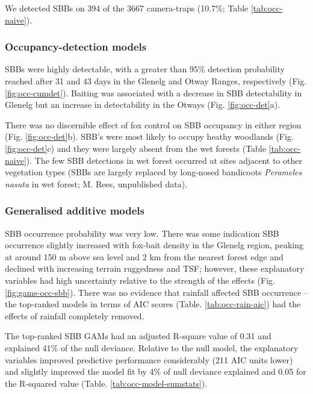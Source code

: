 \documentclass[11pt,a4paper,titlepage,twoside,openright]{style/unimelbthesis}
\begin{document}
\begin{mainmatter}
We detected SBBs on 394 of the 3667 camera-traps (10.7\%; Table \ref{tab:occ-naive}).

\hypertarget{occupancy-detection-models-3}{%
\subsubsection{Occupancy-detection models}\label{occupancy-detection-models-3}}

SBBs were highly detectable, with a greater than 95\% detection probability reached after 31 and 43 days in the Glenelg and Otway Ranges, respectively (Fig. \ref{fig:occ-cumdet}). Baiting was associated with a decrease in SBB detectability in Glenelg but an increase in detectability in the Otways (Fig. \ref{fig:occ-det}a).

There was no discernible effect of fox control on SBB occupancy in either region (Fig. \ref{fig:occ-det}b). SBB's were most likely to occupy heathy woodlands (Fig. \ref{fig:occ-det}c) and they were largely absent from the wet forests (Table \ref{tab:occ-naive}). The few SBB detections in wet forest occurred at sites adjacent to other vegetation types (SBBs are largely replaced by long-nosed bandicoots \emph{Perameles nasuta} in wet forest; M. Rees, unpublished data).

\hypertarget{generalised-additive-models-3}{%
\subsubsection{Generalised additive models}\label{generalised-additive-models-3}}

SBB occurrence probability was very low. There was some indication SBB occurrence slightly increased with fox-bait density in the Glenelg region, peaking at around 150 m above sea level and 2 km from the nearest forest edge and declined with increasing terrain ruggedness and TSF; however, these explanatory variables had high uncertainty relative to the strength of the effects (Fig. \ref{fig:gams-occ-sbb}). There was no evidence that rainfall affected SBB occurrence -- the top-ranked models in terms of AIC scores (Table. \ref{tab:occ-rain-aic}) had the effects of rainfall completely removed.

The top-ranked SBB GAMs had an adjusted R-square value of 0.31 and explained 41\% of the null deviance. Relative to the null model, the explanatory variables improved predictive performance considerably (211 AIC units lower) and slightly improved the model fit by 4\% of null deviance explained and 0.05 for the R-squared value (Table. \ref{tab:occ-model-sumstats}).


\end{mainmatter}
\end{document}
